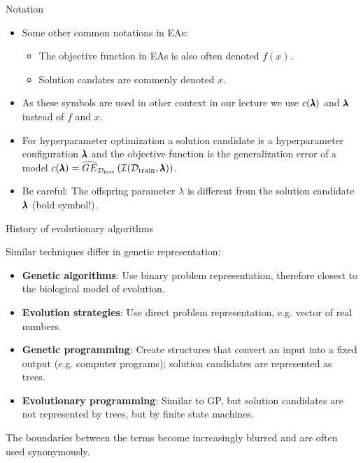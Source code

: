 \begin{frame}{Notation}

\begin{itemize}
    \item Some other common notations in EAs:
    \begin{itemize}
        \item The objective function in EAs is also often denoted $f(x)$.
        \item Solution candates are commenly denoted $x$.
    \end{itemize}
    \item As these symbols are used in other context in our lecture we use $c(\pmb{\lambda})$ and $\pmb{\lambda}$ instead of $f$ and $x$.
    \item For hyperparameter optimization a solution candidate is a hyperparameter configuration $\pmb{\lambda}$ and the objective function is the generalization error of a model $c(\pmb{\lambda}) = \widehat{GE}_{\mathcal{D}_{\text{test}}}\left(\mathcal{I}(\mathcal{D}_{\text{train}}, \pmb{\lambda})\right)$.
    \item Be careful: The offspring parameter $\lambda$ is different from the solution candidate $\pmb{\lambda}$ (bold symbol!).
\end{itemize}

\end{frame}



\begin{frame}{History of evolutionary algorithms}

Similar techniques differ in genetic representation:

\begin{itemize}
\item \textbf{Genetic algorithms}: Use binary problem representation, therefore closest to the biological model of evolution.
\item \textbf{Evolution strategies}: Use direct problem representation, e.g. vector of real numbers.
\item \textbf{Genetic programming}: Create structures that convert an input into a fixed output (e.g. computer programs); solution candidates are represented as trees.
\item \textbf{Evolutionary programming}: Similar to GP, but solution candidates are not represented by trees, but by finite state machines.
\end{itemize}

The boundaries between the terms become increasingly blurred and are often used synonymously.

\end{frame}


